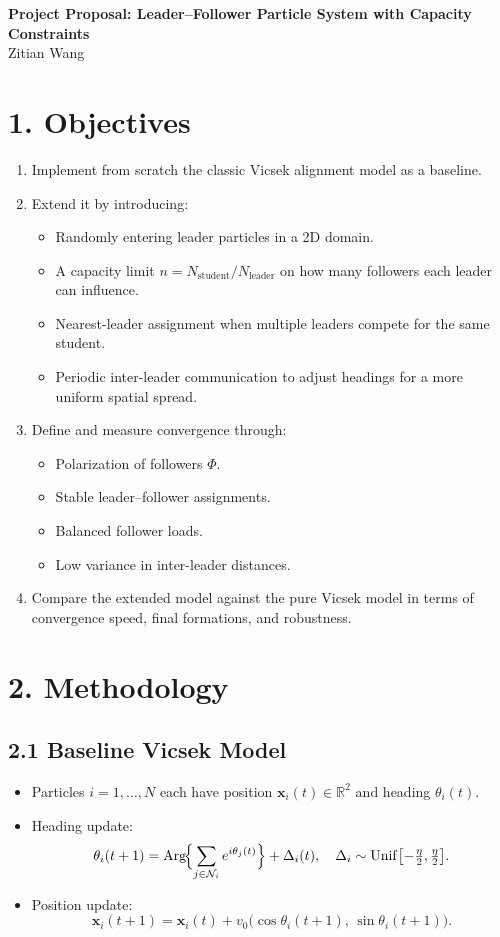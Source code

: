 \documentclass[11pt]{article}
\begin{document}
\begin{center}
  {\LARGE \textbf{Project Proposal: Leader–Follower Particle System with Capacity Constraints}}\\[1em]
  {\large Zitian Wang}
\end{center}

\section*{1. Objectives}
\begin{enumerate}
  \item Implement from scratch the classic Vicsek alignment model as a baseline.
  \item Extend it by introducing:
    \begin{itemize}
      \item Randomly entering leader particles in a 2D domain.
      \item A capacity limit $n = N_{\text{student}} / N_{\text{leader}}$ on how many followers each leader can influence.
      \item Nearest-leader assignment when multiple leaders compete for the same student.
      \item Periodic inter-leader communication to adjust headings for a more uniform spatial spread.
    \end{itemize}
  \item Define and measure convergence through:
    \begin{itemize}
      \item Polarization of followers $\Phi$.
      \item Stable leader–follower assignments.
      \item Balanced follower loads.
      \item Low variance in inter-leader distances.
    \end{itemize}
  \item Compare the extended model against the pure Vicsek model in terms of convergence speed, final formations, and robustness.
\end{enumerate}

\section*{2. Methodology}
\subsection*{2.1 Baseline Vicsek Model}
\begin{itemize}
  \item Particles $i=1,\dots,N$ each have position $\mathbf{x}_i(t)\in\mathbb{R}^2$ and heading $\theta_i(t)$.
  \item Heading update:
    \[
      \theta_i(t+1)
      = \mathrm{Arg}\!\Bigl\{\sum_{j\in\mathcal{N}_i} e^{i\theta_j(t)}\Bigr\} + \Delta_i(t),
      \quad \Delta_i\sim\mathrm{Unif}\bigl[-\tfrac{\eta}{2},\tfrac{\eta}{2}\bigr].
    \]
  \item Position update:
    \[
      \mathbf{x}_i(t+1)
      = \mathbf{x}_i(t) + v_0\bigl(\cos\theta_i(t+1),\,\sin\theta_i(t+1)\bigr).
    \]
\end{itemize}
\end{document}
